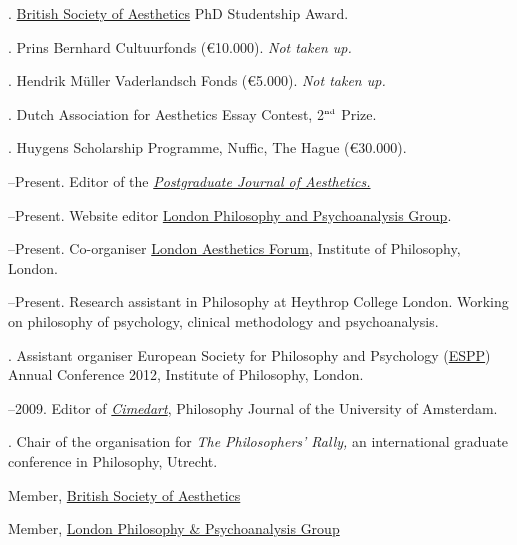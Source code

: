 \documentclass[11pt]{article}
\begin{document}
\medskip

. \href{http://www.british-aesthetics.org}{British Society of Aesthetics} PhD Studentship Award. %

. Prins Bernhard Cultuurfonds (€10.000). \emph{Not taken up.}

. Hendrik Müller Vaderlandsch Fonds (€5.000). \emph{Not taken up.} 

. Dutch Association for Aesthetics Essay Contest, 2$^{\textrm{\tiny{nd}}}$ Prize.

. Huygens Scholarship Programme, Nuffic, The Hague (€30.000).

\bigskip 

\medskip

--Present. Editor of the \href{http:\\www.pjaesthetics.org}{\emph{Postgraduate Journal of Aesthetics.}}

--Present. Website editor \href{http://www.philosophy-psychoanalysis.org.uk}{London Philosophy and Psychoanalysis Group}.

--Present. Co-organiser \href{http:\\www.londonaestheticsforum.org}{London Aesthetics Forum}, Institute of Philosophy, London.

--Present. Research assistant in Philosophy at Heythrop College London. Working on philosophy of psychology, clinical methodology and psychoanalysis.

. Assistant organiser European Society for Philosophy and Psychology (\href{http://www.eurospp.org}{ESPP}) Annual Conference 2012, Institute of Philosophy, London. 

--2009. Editor of \href{http://www.cimedart.nl}{\emph{Cimedart}}, Philosophy Journal of the University of Amsterdam.

. Chair of the organisation for \emph{The Philosophers' Rally,} an international graduate conference in Philosophy, Utrecht.

\bigskip 


\ind Member, \href{http://www.philosophy-psychoanalysis.org.uk}{British Society of Aesthetics}

\ind Member, \href{http://www.philosophy-psychoanalysis.org.uk}{London Philosophy \& Psychoanalysis Group}
\end{document}
